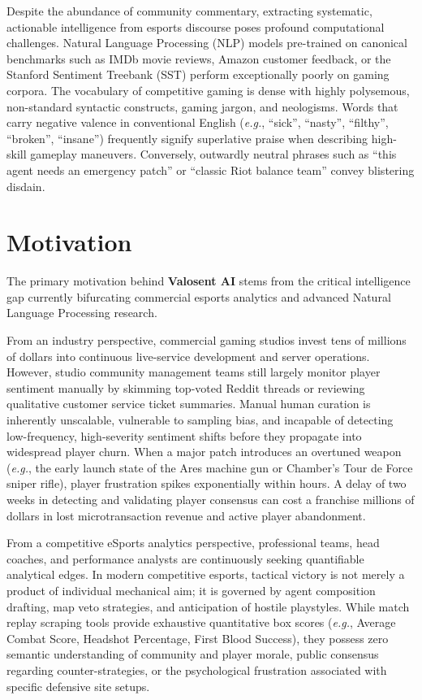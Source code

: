 Despite the abundance of community commentary, extracting systematic, actionable intelligence from esports discourse poses profound computational challenges. Natural Language Processing (NLP) models pre-trained on canonical benchmarks such as IMDb movie reviews, Amazon customer feedback, or the Stanford Sentiment Treebank (SST) perform exceptionally poorly on gaming corpora. The vocabulary of competitive gaming is dense with highly polysemous, non-standard syntactic constructs, gaming jargon, and neologisms. Words that carry negative valence in conventional English (\textit{e.g.}, ``sick'', ``nasty'', ``filthy'', ``broken'', ``insane'') frequently signify superlative praise when describing high-skill gameplay maneuvers. Conversely, outwardly neutral phrases such as ``this agent needs an emergency patch'' or ``classic Riot balance team'' convey blistering disdain.

\section{Motivation}
\label{sec:motivation}

The primary motivation behind \textbf{Valosent AI} stems from the critical intelligence gap currently bifurcating commercial esports analytics and advanced Natural Language Processing research. 

From an industry perspective, commercial gaming studios invest tens of millions of dollars into continuous live-service development and server operations. However, studio community management teams still largely monitor player sentiment manually by skimming top-voted Reddit threads or reviewing qualitative customer service ticket summaries. Manual human curation is inherently unscalable, vulnerable to sampling bias, and incapable of detecting low-frequency, high-severity sentiment shifts before they propagate into widespread player churn. When a major patch introduces an overtuned weapon (\textit{e.g.}, the early launch state of the Ares machine gun or Chamber's Tour de Force sniper rifle), player frustration spikes exponentially within hours. A delay of two weeks in detecting and validating player consensus can cost a franchise millions of dollars in lost microtransaction revenue and active player abandonment.

From a competitive eSports analytics perspective, professional teams, head coaches, and performance analysts are continuously seeking quantifiable analytical edges. In modern competitive esports, tactical victory is not merely a product of individual mechanical aim; it is governed by agent composition drafting, map veto strategies, and anticipation of hostile playstyles. While match replay scraping tools provide exhaustive quantitative box scores (\textit{e.g.}, Average Combat Score, Headshot Percentage, First Blood Success), they possess zero semantic understanding of community and player morale, public consensus regarding counter-strategies, or the psychological frustration associated with specific defensive site setups.


